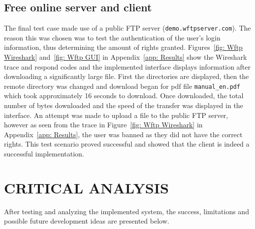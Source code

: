 \documentclass[10pt, conference]{IEEEtran}
\def\code#1{\texttt{#1}}
\begin{document}
\subsection{Free online server and client}
\label{sec: Results Online}
The final test case made use of a public FTP server (\code{demo.wftpserver.com}). The reason this was chosen was to test the authentication of the user's login information, thus determining the amount of rights granted. Figures~\ref{fig: Wftp Wireshark} and~\ref{fig: Wftp GUI} in Appendix~\ref{app: Results} show the Wireshark trace and respond codes and the implemented interface displays information after downloading a significantly large file. First the directories are displayed, then the remote directory was changed and download began for pdf file \code{manual\_en.pdf} which took approximately 16 seconds to download. Once downloaded, the total number of bytes downloaded and the speed of the transfer was displayed in the interface. An attempt was made to upload a file to the public FTP server, however as seen from the trace in Figure~\ref{fig: Wftp Wireshark} in Appendix~\ref{app: Results}, the user was banned as they did not have the correct rights. This test scenario proved successful and showed that the client is indeed a successful implementation.


%
\section{CRITICAL ANALYSIS}
\label{sec: Critical Analysis}
After testing and analyzing the implemented system, the success, limitations and possible future development ideas are presented below.
\end{document}
